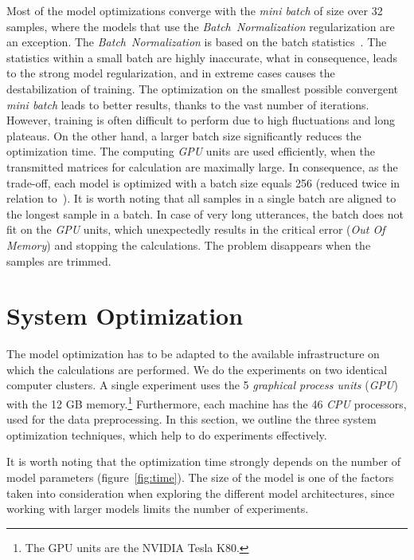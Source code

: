 Most of the model optimizations converge with the \textit{mini batch} of size over 32 samples, where
the models that use the \textit{Batch~Normalization} regularization are an exception.
The \textit{Batch~Normalization} is based on the batch statistics~\cite{laurent2015}.
The statistics within a small batch are highly inaccurate, what in consequence, leads to the strong
model regularization, and in extreme cases causes the destabilization of training.
The optimization on the smallest possible convergent \textit{mini batch} leads to better results,
thanks to the vast number of iterations.
However, training is often difficult to perform due to high fluctuations and long plateaus.
On the other hand, a larger batch size significantly reduces the optimization time.
The computing \textit{GPU} units are used efficiently,
when the transmitted matrices for calculation are maximally large.
In consequence, as the trade-off, each model is optimized with a batch size equals 256 (reduced twice in relation to~\cite{amodei2015}).
It is worth noting that all samples in a single batch are aligned to the longest sample in a batch.
In case of very long utterances, the batch does not fit on the \textit{GPU} units, which unexpectedly results
in the critical error (\textit{Out Of Memory}) and stopping the calculations.
The problem disappears when the samples are trimmed.


\section{System Optimization}\label{sec:system-optimization}

The model optimization has to be adapted to the available infrastructure on which the calculations are performed.
We do the experiments on two identical computer clusters.
A single experiment uses the 5 \textit{graphical process units} (\textit{GPU}) with the 12 GB memory.\footnote{
The GPU units are the NVIDIA Tesla K80.
}
Furthermore, each machine has the 46 \textit{CPU} processors, used for the data preprocessing.
In this section, we outline the three system optimization techniques, which help to do experiments effectively.

It is worth noting that the optimization time strongly depends on the number of model parameters (figure~\ref{fig:time}).
The size of the model is one of the factors taken into consideration when exploring the different model architectures,
since working with larger models limits the number of experiments.

